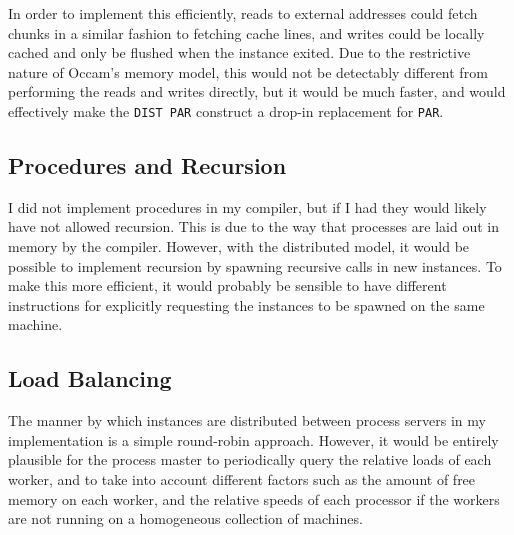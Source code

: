 In order to implement this efficiently, reads to external addresses could fetch
chunks in a similar fashion to fetching cache lines, and writes could be locally
cached and only be flushed when the instance exited. Due to the restrictive
nature of Occam's memory model, this would not be detectably different from
performing the reads and writes directly, but it would be much faster, and would
effectively make the \texttt{DIST PAR} construct a drop-in replacement for
\texttt{PAR}.

\subsection{Procedures and Recursion}

I did not implement procedures in my compiler, but if I had they would likely
have not allowed recursion. This is due to the way that processes are laid out
in memory by the compiler. However, with the distributed model, it would be
possible to implement recursion by spawning recursive calls in new instances.
To make this more efficient, it would probably be sensible to have different
instructions for explicitly requesting the instances to be spawned on the same
machine.

\subsection{Load Balancing}

The manner by which instances are distributed between process servers in my
implementation is a simple round-robin approach. However, it would be entirely
plausible for the process master to periodically query the relative loads of
each worker, and to take into account different factors such as the amount of
free memory on each worker, and the relative speeds of each processor if the
workers are not running on a homogeneous collection of machines.
